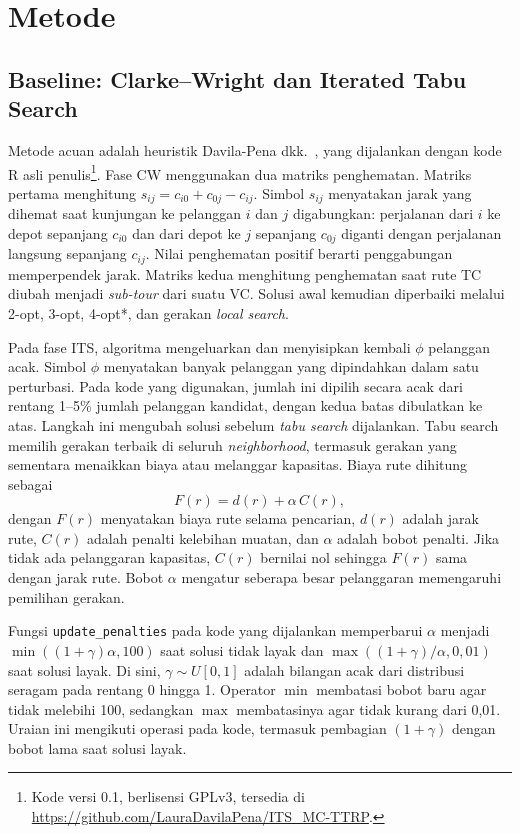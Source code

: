 \documentclass[conference]{IEEEtran}
\begin{document}
\section{Metode}\label{sec:metode}

\subsection{Baseline: Clarke--Wright dan Iterated Tabu Search}

Metode acuan adalah heuristik Davila-Pena dkk.\ \cite{davila2023}, yang dijalankan dengan kode R asli penulis\footnote{Kode versi 0.1, berlisensi GPLv3, tersedia di \url{https://github.com/LauraDavilaPena/ITS_MC-TTRP}.}. Fase CW menggunakan dua matriks penghematan. Matriks pertama menghitung $s_{ij}=c_{i0}+c_{0j}-c_{ij}$. Simbol $s_{ij}$ menyatakan jarak yang dihemat saat kunjungan ke pelanggan $i$ dan $j$ digabungkan: perjalanan dari $i$ ke depot sepanjang $c_{i0}$ dan dari depot ke $j$ sepanjang $c_{0j}$ diganti dengan perjalanan langsung sepanjang $c_{ij}$. Nilai penghematan positif berarti penggabungan memperpendek jarak. Matriks kedua menghitung penghematan saat rute TC diubah menjadi \textit{sub-tour} dari suatu VC. Solusi awal kemudian diperbaiki melalui 2-opt, 3-opt, 4-opt*, dan gerakan \textit{local search}.

Pada fase ITS, algoritma mengeluarkan dan menyisipkan kembali $\phi$ pelanggan acak. Simbol $\phi$ menyatakan banyak pelanggan yang dipindahkan dalam satu perturbasi. Pada kode yang digunakan, jumlah ini dipilih secara acak dari rentang 1--5\% jumlah pelanggan kandidat, dengan kedua batas dibulatkan ke atas. Langkah ini mengubah solusi sebelum \textit{tabu search} dijalankan. Tabu search memilih gerakan terbaik di seluruh \textit{neighborhood}, termasuk gerakan yang sementara menaikkan biaya atau melanggar kapasitas. Biaya rute dihitung sebagai
\begin{equation}
F(r) = d(r) + \alpha\, C(r),\label{eq:tabu}
\end{equation}
dengan $F(r)$ menyatakan biaya rute selama pencarian, $d(r)$ adalah jarak rute, $C(r)$ adalah penalti kelebihan muatan, dan $\alpha$ adalah bobot penalti. Jika tidak ada pelanggaran kapasitas, $C(r)$ bernilai nol sehingga $F(r)$ sama dengan jarak rute. Bobot $\alpha$ mengatur seberapa besar pelanggaran memengaruhi pemilihan gerakan.

Fungsi \texttt{update\_penalties} pada kode yang dijalankan memperbarui $\alpha$ menjadi $\min((1+\gamma)\alpha,100)$ saat solusi tidak layak dan $\max((1+\gamma)/\alpha,0{,}01)$ saat solusi layak. Di sini, $\gamma\sim U[0,1]$ adalah bilangan acak dari distribusi seragam pada rentang 0 hingga 1. Operator $\min$ membatasi bobot baru agar tidak melebihi 100, sedangkan $\max$ membatasinya agar tidak kurang dari 0,01. Uraian ini mengikuti operasi pada kode, termasuk pembagian $(1+\gamma)$ dengan bobot lama saat solusi layak.
\end{document}
